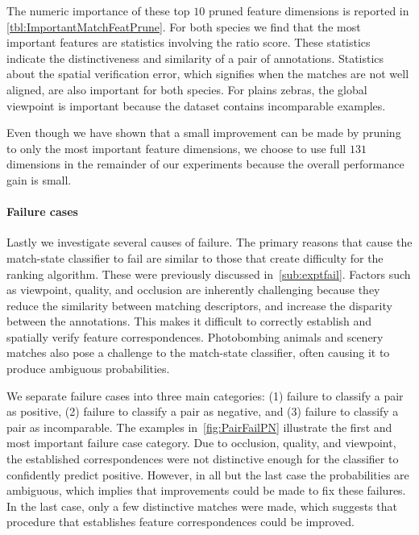         The numeric importance of these top $10$ pruned feature dimensions is reported in
          \cref{tbl:ImportantMatchFeatPrune}.
        For both species we find that the most important features are statistics involving the ratio score.
        These statistics indicate the distinctiveness and similarity of a pair of annotations.
        Statistics about the spatial verification error, which signifies when the matches are not well aligned,
          are also important for both species.
        For plains zebras, the global viewpoint is important because the dataset contains incomparable examples.

        Even though we have shown that a small improvement can be made by pruning to only the most important
          feature dimensions, we choose to use full $131$ dimensions in the remainder of our experiments because
          the overall performance gain is small.

        \MatchPrune{}

        \ImportantMatchFeatPrune{}

        \FloatBarrier{}

        \paragraph{Failure cases}

        Lastly we investigate several causes of failure.
        The primary reasons that cause the match-state classifier to fail are similar to those that create
          difficulty for the ranking algorithm.
        These were previously discussed in~\cref{sub:exptfail}.
        Factors such as viewpoint, quality, and occlusion are inherently challenging because they reduce the
          similarity between matching descriptors, and increase the disparity between the annotations.
        This makes it difficult to correctly establish and spatially verify feature correspondences.
        Photobombing animals and scenery matches also pose a challenge to the match-state classifier, often
          causing it to produce ambiguous probabilities.

        We separate failure cases into three main categories:
        (1) failure to classify a pair as positive,
        (2) failure to classify a pair as negative, and
        (3) failure to classify a pair as incomparable.
        The examples in~\cref{fig:PairFailPN} illustrate the first and most important failure case category.
        Due to occlusion, quality, and viewpoint, the established correspondences were not distinctive enough for
          the classifier to confidently predict positive.
        However, in all but the last case the probabilities are ambiguous, which implies that improvements could
          be made to fix these failures.
        In the last case, only a few distinctive matches were made, which suggests that procedure that
          establishes feature correspondences could be improved.

